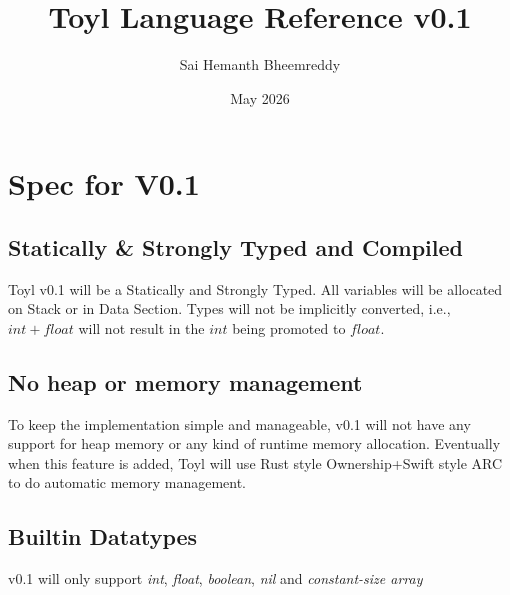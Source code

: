 \documentclass[11pt]{book}
\title{Toyl Language Reference v0.1}
\author{Sai Hemanth Bheemreddy}
\date{May 2026}
\begin{document}
\maketitle

\chapter{Spec for V0.1}


\section{Statically \& Strongly Typed and Compiled}
Toyl v0.1 will be a Statically and Strongly Typed. All variables will be allocated on Stack or in Data Section. Types will not be implicitly converted, i.e., $int + float$ will not result in the $int$ being promoted to $float$.

\section{No heap or memory management}
To keep the implementation simple and manageable, v0.1 will not have any support for heap memory or any kind of runtime memory allocation. Eventually when this feature is added, Toyl will use Rust style Ownership+Swift style ARC to do automatic memory management.

\section{Builtin Datatypes}
v0.1 will only support \textit{int}, \textit{float}, \textit{boolean}, \textit{nil} and \textit{constant-size array}
\end{document}
